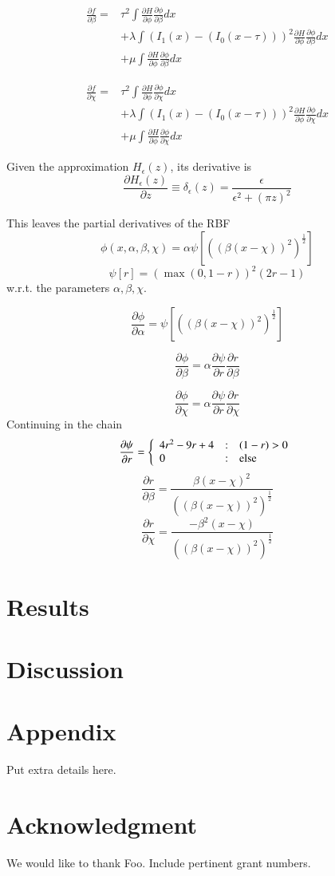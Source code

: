 \documentclass[preprint,review,12pt]{elsarticle}
\begin{document}
\begin{eqnarray*}
\frac{\partial f}{\partial \beta} = & \tau^2\int \frac{\partial
  H}{\partial \phi}\frac{\partial \phi}{\partial \beta} dx \\
& + \lambda \int \left (I_1(x) - (I_0(x-\tau)) \right )^2 \frac{\partial
  H}{\partial \phi}\frac{\partial \phi}{\partial \beta} dx \\
& + \mu \int \frac{\partial
  H}{\partial \phi}\frac{\partial \phi}{\partial \beta} dx
\end{eqnarray*}

\begin{eqnarray*}
\frac{\partial f}{\partial \chi} = & \tau^2\int \frac{\partial
  H}{\partial \phi}\frac{\partial \phi}{\partial \chi} dx \\
& + \lambda \int \left (I_1(x) - (I_0(x-\tau)) \right )^2 \frac{\partial
  H}{\partial \phi}\frac{\partial \phi}{\partial \chi} dx \\
& + \mu \int \frac{\partial
  H}{\partial \phi}\frac{\partial \phi}{\partial \chi} dx
\end{eqnarray*}

\par
Given the approximation $H_\epsilon(z)$, its derivative is
\[
\frac{\partial H_\epsilon(z)}{\partial z} \equiv \delta_\epsilon(z) = 
\frac{\epsilon}{\epsilon^2 + (\pi z)^2}
\]
\par
This leaves the partial derivatives of the RBF 
\[
\phi(x,\alpha,\beta,\chi) = \alpha \psi \left [ ((\beta(x-\chi))^2)^\frac{1}{2}\right ]
\]
\[
\psi[r] = \left ( \max{(0,1-r)} \right )^2(2r-1)
\]
w.r.t. the parameters $\alpha, \beta, \chi$.

\[
\frac{\partial \phi}{\partial \alpha} = \psi \left [ ((\beta(x-\chi))^2)^\frac{1}{2}\right ]
\]

\[
\frac{\partial \phi}{\partial \beta} = \alpha \frac{\partial
  \psi}{\partial r} \frac{\partial r}{\partial \beta}
\]

\[
\frac{\partial \phi}{\partial \chi} = \alpha \frac{\partial
  \psi}{\partial r} \frac{\partial r}{\partial \chi}
\]
Continuing in the chain
\[
\frac{\partial \psi}{\partial r} = \left\{ 
\begin{array}{l@{\quad:\quad}l}
4r^2 - 9r + 4 & (1-r) > 0\\
0 & \mbox{else}
\end{array} \right.
\]
\[
\frac{\partial r}{\partial \beta} = 
\frac{\beta(x-\chi)^2}{((\beta(x-\chi))^2)^\frac{1}{2}}
\]
\[
\frac{\partial r}{\partial \chi} = 
\frac{-\beta^2(x-\chi)}{((\beta(x-\chi))^2)^\frac{1}{2}}
\]

\section{Results}

\section{Discussion}

\section*{Appendix}
Put extra details here.

\section*{Acknowledgment}
We would like to thank Foo. Include pertinent grant numbers.



\end{document}
